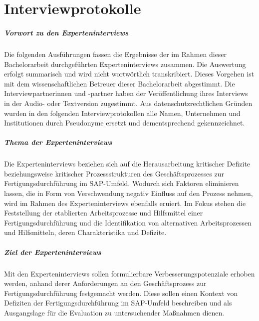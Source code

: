 \chapter{Interviewprotokolle}

\paragraph{Vorwort zu den Experteninterviews}
Die folgenden Ausführungen fassen die Ergebnisse der im Rahmen dieser Bachelorarbeit durchgeführten Experteninterviews zusammen.
Die Auswertung erfolgt summarisch und wird nicht wortwörtlich transkribiert.
Dieses Vorgehen ist mit dem wissenschaftlichen Betreuer dieser Bachelorarbeit abgestimmt.
Die Interviewpartnerinnen und -partner haben der Veröffentlichung ihres Interviews in der Audio- oder Textversion zugestimmt.
Aus datenschutzrechtlichen Gründen wurden in den folgenden Interviewprotokollen alle Namen, Unternehmen und Institutionen durch Pseudonyme ersetzt und dementsprechend gekennzeichnet.

\paragraph{Thema der Experteninterviews}
Die Experteninterviews beziehen sich auf die Herausarbeitung kritischer Defizite beziehungsweise kritischer Prozessstrukturen des Geschäftsprozesses zur Fertigungsdurchführung im SAP-Umfeld.
Wodurch sich Faktoren eliminieren lassen, die in Form von Verschwendung negativ Einfluss auf den Prozess nehmen, wird im Rahmen des Experteninterviews ebenfalls eruiert.
Im Fokus stehen die Feststellung der etablierten Arbeitsprozesse und Hilfsmittel einer Fertigungsdurchführung und die Identifikation von alternativen Arbeitsprozessen und Hilfsmitteln, deren Charakteristika und Defizite.

\paragraph{Ziel der Experteninterviews}
Mit den Experteninterviews sollen formulierbare Verbesserungspotenziale erhoben werden, anhand derer Anforderungen an den Geschäftsprozess zur Fertigungsdurchführung festgemacht werden.
Diese sollen einen Kontext von Defiziten der Fertigungsdurchführung im SAP-Umfeld beschreiben und als Ausgangslage für die Evaluation zu untersuchender Maßnahmen dienen.



